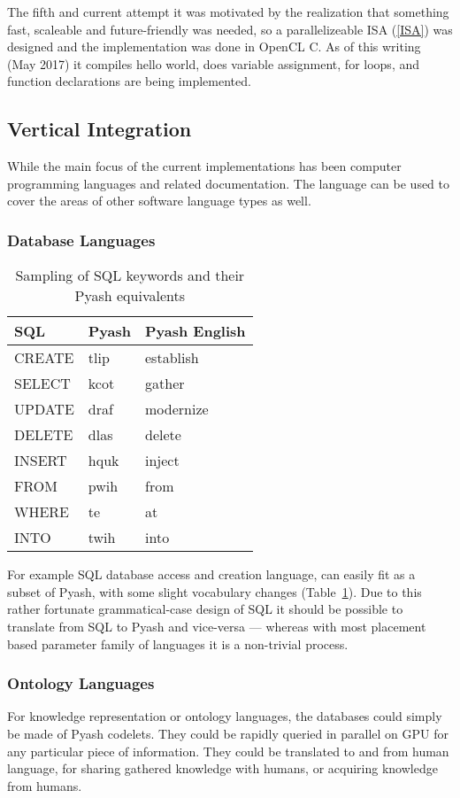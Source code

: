 The fifth and current attempt\cite{pyac} it was motivated by the realization that something fast,
scaleable and future-friendly was needed, so a parallelizeable ISA (\ref{ISA})
was designed
and the implementation was done in OpenCL C. As of this writing (May 2017) it 
compiles hello world, does variable assignment, for loops, and 
function declarations are being implemented.

\subsection{Vertical Integration}

While the main focus of the current implementations has been computer
programming languages and related documentation. The language can be used to
cover the areas of other software language types as well.

\subsubsection{Database Languages}
\begin{table}
  \begin{tabular}{lll}
    SQL & Pyash & Pyash English \\
    \midrule{}
    CREATE  & tlip & establish \\
    SELECT & kcot & gather \\
    UPDATE & draf & modernize \\
    DELETE & dlas & delete \\
    INSERT & hquk & inject \\
    FROM & pwih & from \\
    WHERE & te & at \\
    INTO & twih & into \\
  \end{tabular}
  \caption{Sampling of SQL keywords and their Pyash
  equivalents}\label{table:SQL}
\end{table}

For example SQL database access and creation language, can easily fit as a
subset of Pyash, with some slight vocabulary changes (Table~\ref{table:SQL}). 
Due to this rather fortunate grammatical-case design of SQL it should 
be possible to translate from SQL to Pyash and vice-versa --- 
whereas with most placement based
parameter family of languages it is a non-trivial process.

\subsubsection{Ontology Languages}
For knowledge representation or ontology languages, the databases could simply
be made of Pyash codelets. They could be rapidly queried in parallel on GPU for 
any particular piece of information. They could be translated to and from  human language,
for sharing gathered knowledge with humans, or acquiring knowledge from humans. 

